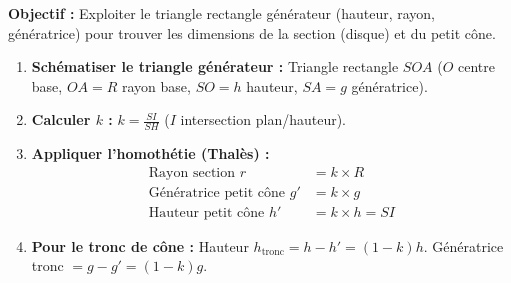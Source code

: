 \documentclass[11pt]{article}
\begin{document}
\begin{methode}
    \textbf{Objectif :} Exploiter le triangle rectangle générateur (hauteur, rayon, génératrice) pour trouver les dimensions de la section (disque) et du petit cône.
    \begin{enumerate}
        \item \textbf{Schématiser le triangle générateur :} Triangle rectangle $SOA$ ($O$ centre base, $OA = R$ rayon base, $SO = h$ hauteur, $SA = g$ génératrice).
        \item \textbf{Calculer $k$ :} $k = \frac{SI}{SH}$ ($I$ intersection plan/hauteur).
        \item \textbf{Appliquer l'homothétie (Thalès) :}
            \begin{align*}
                \text{Rayon section } r &= k \times R \\
                \text{Génératrice petit cône } g' &= k \times g \\
                \text{Hauteur petit cône } h' &= k \times h = SI
            \end{align*}
        \item \textbf{Pour le tronc de cône :} Hauteur $h_{\text{tronc}} = h - h' = (1-k)h$. Génératrice tronc $= g - g' = (1-k)g$.
    \end{enumerate}
\end{methode}
\end{document}

